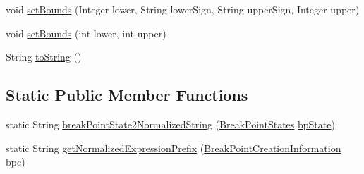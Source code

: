 \begin{DoxyCompactItemize}
\item 
void \hyperlink{classgov_1_1nasa_1_1jpf_1_1inspector_1_1client_1_1commands_1_1_cmd_breakpoint_create_1_1_console_breakpoint_creation_expression_af93f6cdebd435b5c1ef64bed34344d30}{set\+Bounds} (Integer lower, String lower\+Sign, String upper\+Sign, Integer upper)
\item 
void \hyperlink{classgov_1_1nasa_1_1jpf_1_1inspector_1_1client_1_1commands_1_1_cmd_breakpoint_create_1_1_console_breakpoint_creation_expression_a0203aef18ea439cd7d7b1fae31b235ab}{set\+Bounds} (int lower, int upper)
\item 
String \hyperlink{classgov_1_1nasa_1_1jpf_1_1inspector_1_1client_1_1commands_1_1_cmd_breakpoint_create_1_1_console_breakpoint_creation_expression_a722fd08362a8cb5a9e0a80c3d3fbf815}{to\+String} ()
\end{DoxyCompactItemize}
\subsection*{Static Public Member Functions}
\begin{DoxyCompactItemize}
\item 
static String \hyperlink{classgov_1_1nasa_1_1jpf_1_1inspector_1_1client_1_1commands_1_1_cmd_breakpoint_create_1_1_console_breakpoint_creation_expression_a4ce446ae4313e893c81b66d39ba144a2}{break\+Point\+State2\+Normalized\+String} (\hyperlink{enumgov_1_1nasa_1_1jpf_1_1inspector_1_1interfaces_1_1_break_point_states}{Break\+Point\+States} \hyperlink{classgov_1_1nasa_1_1jpf_1_1inspector_1_1client_1_1commands_1_1_cmd_breakpoint_create_1_1_console_breakpoint_creation_expression_adb662e43ca08e3ea6852f1af80502ff6}{bp\+State})
\item 
static String \hyperlink{classgov_1_1nasa_1_1jpf_1_1inspector_1_1client_1_1commands_1_1_cmd_breakpoint_create_1_1_console_breakpoint_creation_expression_a034dc56e18b68f32311255d6139febe9}{get\+Normalized\+Expression\+Prefix} (\hyperlink{interfacegov_1_1nasa_1_1jpf_1_1inspector_1_1interfaces_1_1_break_point_creation_information}{Break\+Point\+Creation\+Information} bpc)
\end{DoxyCompactItemize}
